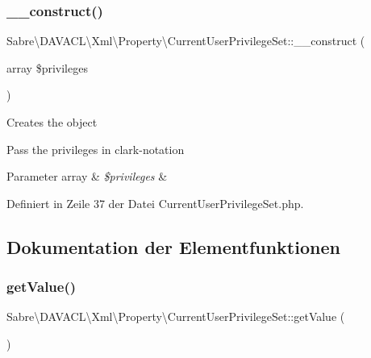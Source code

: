 \subsubsection{\texorpdfstring{\+\_\+\+\_\+construct()}{\_\_construct()}}
{\footnotesize\ttfamily Sabre\textbackslash{}\+D\+A\+V\+A\+C\+L\textbackslash{}\+Xml\textbackslash{}\+Property\textbackslash{}\+Current\+User\+Privilege\+Set\+::\+\_\+\+\_\+construct (\begin{DoxyParamCaption}\item[{array}]{\$privileges }\end{DoxyParamCaption})}

Creates the object

Pass the privileges in clark-\/notation


\begin{DoxyParams}[1]{Parameter}
array & {\em \$privileges} & \\
\hline
\end{DoxyParams}


Definiert in Zeile 37 der Datei Current\+User\+Privilege\+Set.\+php.



\subsection{Dokumentation der Elementfunktionen}
\mbox{\label{class_sabre_1_1_d_a_v_a_c_l_1_1_xml_1_1_property_1_1_current_user_privilege_set_a28399e4d5a99201259b81c0eaf4d5b7b}} 
\subsubsection{\texorpdfstring{get\+Value()}{getValue()}}
{\footnotesize\ttfamily Sabre\textbackslash{}\+D\+A\+V\+A\+C\+L\textbackslash{}\+Xml\textbackslash{}\+Property\textbackslash{}\+Current\+User\+Privilege\+Set\+::get\+Value (\begin{DoxyParamCaption}{ }\end{DoxyParamCaption})}

